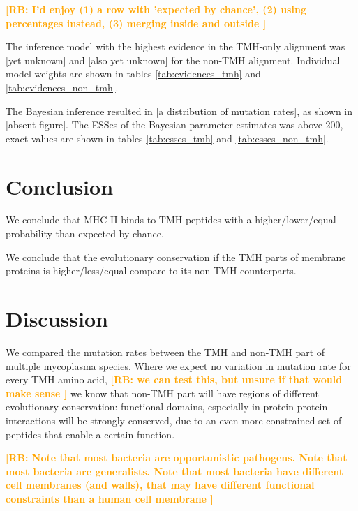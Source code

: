 \documentclass{article}
\newcommand{\richel}[1]{\textcolor{orange}{\textbf{[RB: #1]}}}
\begin{document}

\richel{
  I'd enjoy 
  (1) a row with 'expected by chance', 
  (2) using percentages instead,
  (3) merging inside and outside
}

The inference model with the highest evidence in the
TMH-only alignment was [yet unknown] and [also yet unknown]
for the non-TMH alignment. Individual model weights are shown
in tables \ref{tab:evidences_tmh} 
and \ref{tab:evidences_non_tmh}.

The Bayesian inference resulted in [a distribution of mutation rates],
as shown in [absent figure].
The ESSes of the Bayesian parameter estimates was above 200, exact values
are shown in tables \ref{tab:esses_tmh} and \ref{tab:esses_non_tmh}.

\section{Conclusion}

We conclude that MHC-II binds to TMH peptides with a higher/lower/equal
probability than expected by chance. 

We conclude that the evolutionary conservation if the TMH parts of membrane
proteins is higher/less/equal compare to its non-TMH counterparts.

\section{Discussion}

We compared the mutation rates between the TMH and non-TMH part of
multiple mycoplasma species. Where we expect no variation 
in mutation rate for every TMH amino acid,
\richel{
  we can test this, but unsure if that would make sense
}
we know that non-TMH part will have regions of different evolutionary
conservation: functional domains, especially in protein-protein
interactions will be strongly conserved, due to an even more constrained
set of peptides that enable a certain function.

\richel{
  Note that most bacteria are opportunistic pathogens.
  Note that most bacteria are generalists.
  Note that most bacteria have different cell membranes (and walls), that
  may have different functional constraints than a human cell membrane
}
\end{document}
